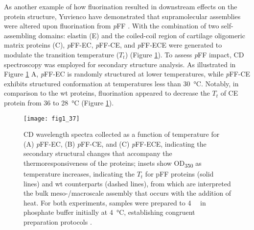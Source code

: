 \begin{refsection}
As another example of how fluorination resulted in downstream effects on the
protein structure, Yuvienco  have demonstrated that supramolecular
assemblies were altered upon fluorination from \emph{p}FF
\cite{Yuvienco2012b}. With the combination of two self-assembling domains:
elastin (E) and the coiled-coil region of cartilage oligomeric matrix proteins
(C), \emph{p}FF-EC, \emph{p}FF-CE, and \emph{p}FF-ECE were generated to
modulate the transition temperature (${T_t}$) (Figure \ref{fig:carlo}). To
assess \emph{p}FF impact, CD spectroscopy was employed for secondary structure
analysis. As illustrated in Figure \ref{fig:carlo} A, \emph{p}FF-EC is
randomly structured at lower temperatures, while \emph{p}FF-CE exhibits
structured conformation at temperatures less than \SI{30}{\celsius}. Notably,
in comparison to the wt proteins, fluorination appeared to decrease the ${T_t}$
of CE protein from 36 to \SI{28}{\celsius} \cite{Yuvienco2012b} (Figure
\ref{fig:carlo}). 
\begin{figure}[htbp] \centering \texttt{[image: fig1\_37]}
    \caption[CD wavelength spectra collected as a function of temperature for
    (A) \emph{p}FF-EC, (B) \emph{p}FF-CE, and (C) \emph{p}FF-ECE, indicating
the secondary structural changes that accompany the thermoresponsiveness of the
proteins; insets show OD\textsubscript{350} as temperature increases,
indicating the ${T_t}$ for pFF proteins (solid lines) and wt counterparts
(dashed lines), from which are interpreted the bulk meso-/macroscale assembly
that occurs with the addition of heat. For both experiments, samples were
prepared to \SI{4}{\micro\Molar} in phosphate buffer initially at
\SI{4}{\celsius}, establishing congruent preparation protocols.]{CD wavelength
    spectra collected as a function of temperature for (A) \emph{p}FF-EC, (B)
    \emph{p}FF-CE, and (C) \emph{p}FF-ECE, indicating the secondary structural
    changes that accompany the thermoresponsiveness of the proteins; insets
    show OD\textsubscript{350} as temperature increases, indicating the ${T_t}$
    for pFF proteins (solid lines) and wt counterparts (dashed lines), from
    which are interpreted the bulk meso-/macroscale assembly that occurs with
    the addition of heat. For both experiments, samples were prepared to
    \SI{4}{\micro\Molar} in phosphate buffer initially at \SI{4}{\celsius},
    establishing congruent preparation protocols \cite{Yuvienco2012b}.}
    \label{fig:carlo}
\end{figure}


\end{refsection}
